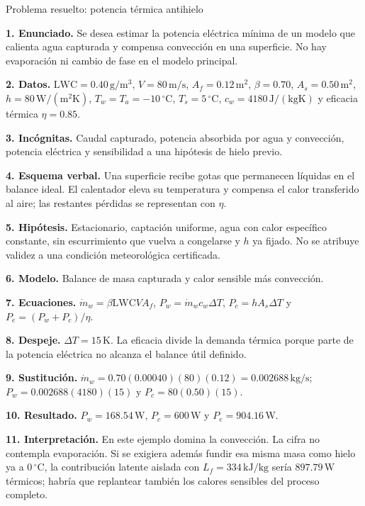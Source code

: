 \begin{studiumworked}{Problema resuelto: potencia térmica antihielo}

\textbf{1. Enunciado.} Se desea estimar la potencia eléctrica mínima de un modelo que calienta agua capturada y compensa convección en una superficie. No hay evaporación ni cambio de fase en el modelo principal.

\textbf{2. Datos.} $\mathrm{LWC}=0.40\,\mathrm{g/m^3}$, $V=80\,\mathrm{m/s}$, $A_f=0.12\,\mathrm{m^2}$, $\beta=0.70$, $A_s=0.50\,\mathrm{m^2}$, $h=80\,\mathrm{W/(m^2K)}$, $T_w=T_a=-10\,{}^\circ\mathrm{C}$, $T_s=5\,{}^\circ\mathrm{C}$, $c_w=4180\,\mathrm{J/(kgK)}$ y eficacia térmica $\eta=0.85$.

\textbf{3. Incógnitas.} Caudal capturado, potencia absorbida por agua y convección, potencia eléctrica y sensibilidad a una hipótesis de hielo previo.

\textbf{4. Esquema verbal.} Una superficie recibe gotas que permanecen líquidas en el balance ideal. El calentador eleva su temperatura y compensa el calor transferido al aire; las restantes pérdidas se representan con $\eta$.

\textbf{5. Hipótesis.} Estacionario, captación uniforme, agua con calor específico constante, sin escurrimiento que vuelva a congelarse y $h$ ya fijado. No se atribuye validez a una condición meteorológica certificada.

\textbf{6. Modelo.} Balance de masa capturada y calor sensible más convección.

\textbf{7. Ecuaciones.} $\dot m_w=\beta\mathrm{LWC}VA_f$, $P_w=\dot m_wc_w\Delta T$, $P_c=hA_s\Delta T$ y $P_e=(P_w+P_c)/\eta$.

\textbf{8. Despeje.} $\Delta T=15\,\mathrm{K}$. La eficacia divide la demanda térmica porque parte de la potencia eléctrica no alcanza el balance útil definido.

\textbf{9. Sustitución.} $\dot m_w=0.70(0.00040)(80)(0.12)=0.002688\,\mathrm{kg/s}$; $P_w=0.002688(4180)(15)$ y $P_c=80(0.50)(15)$.

\textbf{10. Resultado.} $P_w=168.54\,\mathrm{W}$, $P_c=600\,\mathrm{W}$ y $P_e=904.16\,\mathrm{W}$.

\textbf{11. Interpretación.} En este ejemplo domina la convección. La cifra no contempla evaporación. Si se exigiera además fundir esa misma masa como hielo ya a $0\,{}^\circ\mathrm{C}$, la contribución latente aislada con $L_f=334\,\mathrm{kJ/kg}$ sería $897.79\,\mathrm{W}$ térmicos; habría que replantear también los calores sensibles del proceso completo.


\end{studiumworked}
